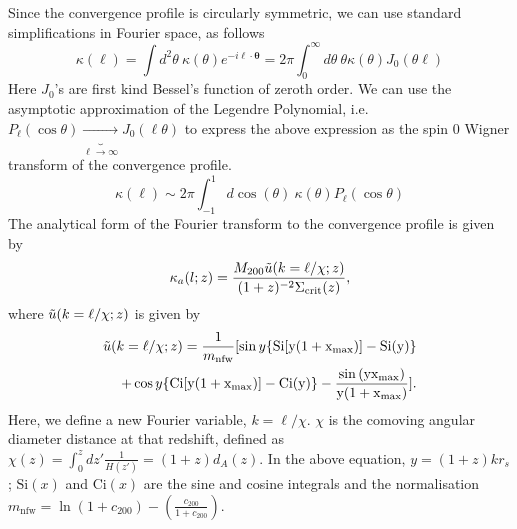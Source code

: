 \documentclass[prd, superscriptaddress, tightenlines, longbibliography, nofootinbib, eqsecnum, amsfonts, amsmath, floatfix, twocolumn, notitlepage]{revtex4-2}
\newcommand{\bs}[1]{\boldsymbol{#1}}
\begin{document}
Since the convergence profile is circularly symmetric, we can use standard simplifications in Fourier space, as follows
\begin{equation}
    \kappa(\ell) = \int d^2 \theta\: \kappa(\theta) e^{- i \bs{\ell}\cdot\bs{\theta}} = 2\pi \int_0^{\infty} d\theta \: \theta \kappa(\theta) J_0(\theta \ell)
\end{equation}
Here $J_0$'s are first kind Bessel's function of zeroth order. We can use the asymptotic approximation of the Legendre Polynomial, i.e. $P_\ell(\cos \theta) \underbrace{\rightarrow}_{\ell \rightarrow \infty} J_0(\ell \theta)$ to express the above expression as the spin 0 Wigner transform of the convergence profile.
\begin{equation}
    \kappa(\ell) \sim 2\pi \int_{-1}^1 d \cos (\theta )\:\kappa(\theta) P_\ell(\cos \theta)
\end{equation}
The analytical form of the Fourier transform to the convergence profile is given by \cite{Scoccimarro:2000gm, 2011PhRvD..83b3008O, Takada:2002qq}%
\begin{equation}\label{eq:ft_anal1}
    \kappa_{a}(l;z) = \frac{M_{200}\Tilde{u}(k=\ell/\chi;z)}{(1+z)^{-2}\Sigma_{\text{crit}}(z)},
\end{equation}
where $\Tilde{u}(k=\ell/\chi;z)$ is given by
\begin{align}\label{eq:ft_anal2}
    \Tilde{u}(k=\ell/\chi;z) = \frac{1}{m_{\text{nfw}}}[\sin{y}\{\text{Si}[y(1+x_{\text{max}})] -\text{Si}(y)\} \nonumber \\ 
    +\cos{y}\{ \text{Ci}[y(1+x_{\text{max}})]-\text{Ci}(y) \} - \frac{\sin{(y x_{\text{max}})}}{y(1+x_{\text{max}})}].
\end{align}
Here, we define a new Fourier variable, $k =\ell/\chi$. $\chi$ is the comoving angular diameter distance at that redshift, defined as $\chi(z) = \int_0^z dz'\frac{1}{H(z')} = (1+z)d_A(z)$. In the above equation, $y = (1+z)kr_s$; $\text{Si}(x)$ and $\text{Ci}(x)$ are the sine and cosine integrals and the normalisation $m_{\text{nfw}} = \ln{(1+c_{200})}-\left(\frac{c_{200}}{1+c_{200}}\right)$.

\end{document}
